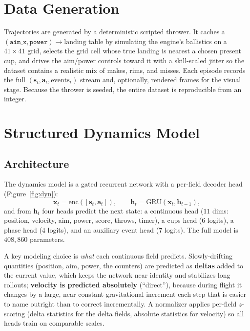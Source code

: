 \documentclass[11pt]{article}
\newcommand{\vect}[1]{\mathbf{#1}}
\newcommand{\stt}{\vect{s}}
\newcommand{\act}{\vect{a}}
\newcommand{\code}[1]{\texttt{#1}}
\begin{document}
\section{Data Generation}

Trajectories are generated by a deterministic scripted thrower. It caches a $(\code{aim\_x},\code{power})\!\to\!\text{landing}$ table by simulating the engine's ballistics on a $41\times41$ grid, selects the grid cell whose true landing is nearest a chosen present cup, and drives the aim/power controls toward it with a skill-scaled jitter so the dataset contains a realistic mix of makes, rims, and misses. Each episode records the full $(\stt_t,\act_t,\text{events}_t)$ stream and, optionally, rendered frames for the visual stage. Because the thrower is seeded, the entire dataset is reproducible from an integer.

\section{Structured Dynamics Model}

\subsection{Architecture}

The dynamics model is a gated recurrent network \cite{gru} with a per-field decoder head (Figure~\ref{fig:dyn}):
\begin{equation}
    \vect{x}_t = \mathrm{enc}([\stt_t,\act_t]),\qquad \vect{h}_t = \mathrm{GRU}(\vect{x}_t,\vect{h}_{t-1}),
\end{equation}
and from $\vect{h}_t$ four heads predict the next state: a continuous head ($11$ dims: position, velocity, aim, power, score, throws, timer), a cups head ($6$ logits), a phase head ($4$ logits), and an auxiliary event head ($7$ logits). The full model is $408{,}860$ parameters.

A key modeling choice is \emph{what} each continuous field predicts. Slowly-drifting quantities (position, aim, power, the counters) are predicted as \textbf{deltas} added to the current value, which keeps the network near identity and stabilizes long rollouts; \textbf{velocity is predicted absolutely} (``direct''), because during flight it changes by a large, near-constant gravitational increment each step that is easier to name outright than to correct incrementally. A normalizer applies per-field $z$-scoring (delta statistics for the delta fields, absolute statistics for velocity) so all heads train on comparable scales.
\end{document}
